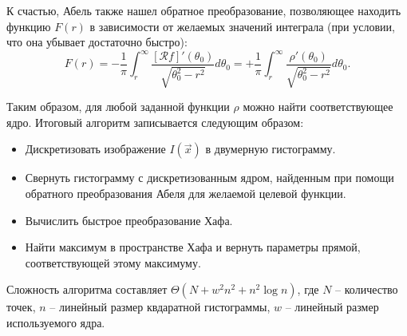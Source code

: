 К счастью, Абель также нашел обратное преобразование, позволяющее находить функцию $F(r)$ в зависимости от желаемых значений интеграла (при условии, что она убывает достаточно быстро):
\begin{equation*}
    F(r) =
    -\frac{1}{\pi} \int_r^\infty \frac{\left[ \mathcal{R}f \right]'\left( \theta_0 \right)}{\sqrt{\theta_0^2 - r^2}}d\theta_0 =
    +\frac{1}{\pi} \int_r^\infty \frac{\rho'\left( \theta_0 \right)}{\sqrt{\theta_0^2 - r^2}}d\theta_0.
\end{equation*}

Таким образом, для любой заданной функции $\rho$ можно найти соответствующее ядро. Итоговый алгоритм записывается следующим образом:
\begin{itemize}
\item
    Дискретизовать изображение $I\left( \vec x \right)$ в двумерную гистограмму.
\item
    Свернуть гистограмму с дискретизованным ядром, найденным при помощи обратного преобразования Абеля для желаемой целевой функции.
\item
    Вычислить быстрое преобразование Хафа.
\item
    Найти максимум в пространстве Хафа и вернуть параметры прямой, соответствующей этому максимуму.
\end{itemize}

Сложность алгоритма составляет $\Theta\left( N + w^2 n^2 + n^2 \log n \right)$, где $N$ -- количество точек, $n$ -- линейный размер квдаратной гистограммы, $w$ -- линейный размер используемого ядра.
